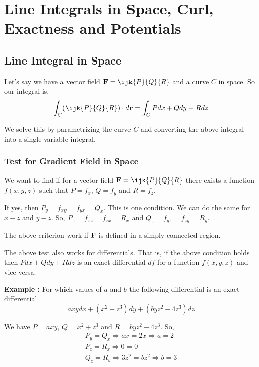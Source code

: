 

\chapter{Line Integrals in Space, Curl, Exactness and Potentials} 

\bigbreak

\section{Line Integral in Space}

Let's say we have a vector field ${\bf F} = \ijk{P}{Q}{R}$ and a curve $C$ in space.
So our integral is,
$$ \int_C (\ijk{P}{Q}{R}) \cdot d{\bf r} = \int_C Pdx + Qdy + Rdz $$

We solve this by parametrizing the curve $C$ and converting the above integral into a single variable integral.

\subsection{Test for Gradient Field in Space}

We want to find if for a vector field ${\bf F} = \ijk{P}{Q}{R}$ there exists a function $f(x, y, z)$
such that $P = f_x$, $Q = f_y$ and $R = f_z$.

If yes, then $P_y = f_{xy} = f_{yx} = Q_x$.
This is one condition. We can do the same for $x-z$ and $y-z$.
So, $P_z = f_{xz} = f_{zx} = R_x$ and $Q_z = f_{yz} = f_{zy} = R_y$.

The above criterion work if ${\bf F}$ is defined in a simply connected region.

The above test also works for differentials. That is, if the above condition holds then
$Pdx + Qdy + Rdz$ is an exact differential $df$ for a function $f(x, y, z)$ and vice versa.

{\bf Example : }  For which values of $a$ and $b$ the following differential is an exact differential.
$$ axy dx + (x^2 + z^3) dy + (byz^2 - 4z^3)dz $$

We have $P = axy$, $Q = x^2 + z^3$ and $R = byz^2 - 4z^3$.
So, 
\begin{gather*}
P_y = Q_x \Rightarrow ax = 2x \Rightarrow a = 2 \\
P_z = R_x \Rightarrow 0 = 0 \\
Q_z = R_y \Rightarrow 3z^2 = bz^2 \Rightarrow b = 3
\end{gather*}


